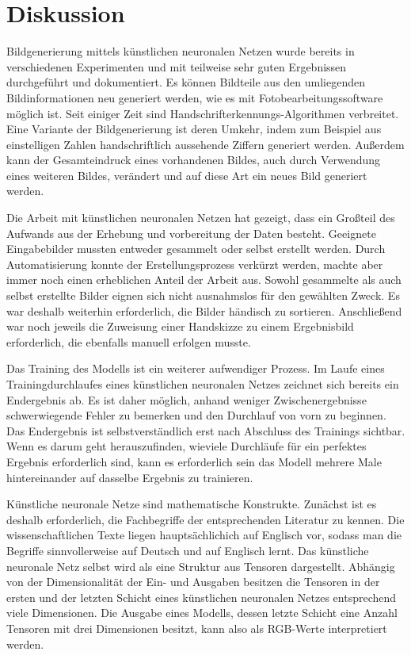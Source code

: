 \chapter{Diskussion}
\label{sec:conclusion}
Bildgenerierung mittels künstlichen neuronalen Netzen wurde bereits in verschiedenen Experimenten und mit teilweise sehr guten Ergebnissen durchgeführt und dokumentiert. Es können Bildteile aus den umliegenden Bildinformationen neu generiert werden, wie es mit Fotobearbeitungssoftware möglich ist. Seit einiger Zeit sind Handschrifterkennungs-Algorithmen verbreitet. Eine Variante der Bildgenerierung ist deren Umkehr, indem zum Beispiel aus einstelligen Zahlen handschriftlich aussehende Ziffern generiert werden. Außerdem kann der Gesamteindruck eines vorhandenen Bildes, auch durch Verwendung eines weiteren Bildes, verändert und auf diese Art ein neues Bild generiert werden.

Die Arbeit mit künstlichen neuronalen Netzen hat gezeigt, dass ein Großteil des Aufwands aus der Erhebung und vorbereitung der Daten besteht. Geeignete Eingabebilder mussten entweder gesammelt oder selbst erstellt werden. Durch Automatisierung konnte der Erstellungsprozess verkürzt werden, machte aber immer noch einen erheblichen Anteil der Arbeit aus. Sowohl gesammelte als auch selbst erstellte Bilder eignen sich nicht ausnahmslos für den gewählten Zweck. Es war deshalb weiterhin erforderlich, die Bilder händisch zu sortieren. Anschließend war noch jeweils die Zuweisung einer Handskizze zu einem Ergebnisbild erforderlich, die ebenfalls manuell erfolgen musste.

Das Training des Modells ist ein weiterer aufwendiger Prozess. Im Laufe eines Trainingdurchlaufes eines künstlichen neuronalen Netzes zeichnet sich bereits ein Endergebnis ab. Es ist daher möglich, anhand weniger Zwischenergebnisse schwerwiegende Fehler zu bemerken und den Durchlauf von vorn zu beginnen. Das Endergebnis ist selbstverständlich erst nach Abschluss des Trainings sichtbar. Wenn es darum geht herauszufinden, wieviele Durchläufe für ein perfektes Ergebnis erforderlich sind, kann es erforderlich sein das Modell mehrere Male hintereinander auf dasselbe Ergebnis zu trainieren.

Künstliche neuronale Netze sind mathematische Konstrukte. Zunächst ist es deshalb erforderlich, die Fachbegriffe der entsprechenden Literatur zu kennen. Die wissenschaftlichen Texte liegen hauptsächlichich auf Englisch vor, sodass man die Begriffe sinnvollerweise auf Deutsch und auf Englisch lernt. Das künstliche neuronale Netz selbst wird als eine Struktur aus Tensoren dargestellt. Abhängig von der Dimensionalität der Ein- und Ausgaben besitzen die Tensoren in der ersten und der letzten Schicht eines künstlichen neuronalen Netzes entsprechend viele Dimensionen. Die Ausgabe eines Modells, dessen letzte Schicht eine Anzahl Tensoren mit drei Dimensionen besitzt, kann also als RGB-Werte interpretiert werden.

